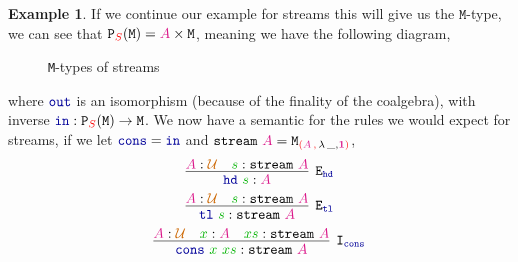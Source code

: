 \documentclass[twoside,11pt,openright]{report}
\theoremstyle{plain} %
\theoremstyle{definition}
\newtheorem{exmp}{Example}[section]
\theoremstyle{remark}
\newcommand*{\term}[1]{\textcolor{green!70!black}{#1}} %
\newcommand*{\type}[1]{\textcolor{magenta!90!black}{#1}}
\newcommand*{\container}[1]{\textcolor{red}{#1}}
\newcommand*{\containerpair}[2]{\textcolor{red}{(}#1\,\textcolor{red}{,}\,#2\textcolor{red}{)}}
\newcommand*{\universe}[1]{\textcolor{orange!80!black}{#1}}
\newcommand*{\unit}{\type{\textbf{1}}}
\newcommand*{\function}[1]{\textcolor{blue!60!black}{\ensuremath{\mathtt{#1}}}}
\newcommand*{\typeformer}[1]{\ensuremath{\mathtt{#1}}}
\newcommand*{\functor}[1]{\ensuremath{\mathbf{\mathtt{#1}}}}
\begin{document}
\begin{exmp}
  If we continue our example for streams this will give us the \(\mathtt{M}\)-type, we can see that \(\functor{P}_{\container{S}}(\typeformer{M}) = \type{A} \times \typeformer{M}\), meaning we have the following diagram,
  \begin{figure}[h]
    \centering
    \caption{\texttt{M}-types of streams}
  \end{figure}
  where \(\function{out}\) is an isomorphism (because of the finality of the coalgebra), with inverse \(\function{in} : \functor{P}_{\container{S}}(\typeformer{M}) \rightarrow \typeformer{M}\). We now have a semantic for the rules we would expect for streams, if we let \(\function{cons} = \function{in}\) and \(\typeformer{stream}~\type{A} = \typeformer{M}_{\containerpair{\type{A}}{\lambda\,\_,\unit}}\),
  \begin{equation}
    \infer[\mathtt{E}_{\function{hd}}]{\function{hd}~\term{s} : \type{A}}{\type{A} : \universe{\mathcal{U}} & \term{s} : \typeformer{stream}~\type{A}}
  \end{equation}
  \begin{equation}
    \infer[\mathtt{E}_{\function{tl}}]{\function{tl}~\term{s} : \typeformer{stream}~\type{A}}{\type{A} : \universe{\mathcal{U}} & \term{s} : \typeformer{stream}~\type{A}}
  \end{equation}
  \begin{equation}
    \infer[\mathtt{I}_{\function{cons}}]{\term{\function{cons}}~\term{x}~\term{xs} : \typeformer{stream}~\type{A}}{\type{A} : \universe{\mathcal{U}} & \term{x} : \type{A} & \term{xs} : \typeformer{stream}~\type{A}}
  \end{equation}  
\end{exmp}
\end{document}
